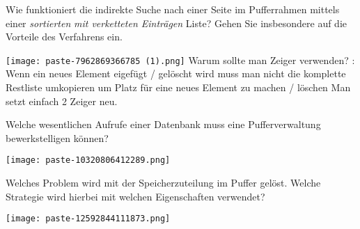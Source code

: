 \documentclass{article}
\begin{document}
\begin{tcolorbox}[colback=white!10!white,colframe=lightgray!75!black,
  savelowerto=\jobname_ex.tex,breakable,enhanced,lines before break=40]

\begin{center}
 Wie funktioniert die indirekte Suche nach einer Seite im Pufferrahmen mittels einer
\textit{sortierten
}\textit{mit verketteten Einträgen
}Liste? Gehen Sie insbesondere auf die Vorteile des Verfahrens ein. 

\end{center}

\tcblower

\justifying
\texttt{[image: paste-7962869366785 (1).png]}
Warum sollte man Zeiger verwenden?
:
Wenn ein neues Element eigefügt / gelöscht wird muss man nicht die komplette Restliste umkopieren um Platz für eine neues Element zu machen / löschen  Man setzt einfach 2 Zeiger neu.

\end{tcolorbox}
\begin{tcolorbox}[colback=white!10!white,colframe=lightgray!75!black,
  savelowerto=\jobname_ex.tex,breakable,enhanced,lines before break=40]

\begin{center}
 Welche wesentlichen Aufrufe einer Datenbank muss eine Pufferverwaltung bewerkstelligen können? 

\end{center}

\tcblower

\justifying
\texttt{[image: paste-10320806412289.png]}

\end{tcolorbox}
\begin{tcolorbox}[colback=white!10!white,colframe=lightgray!75!black,
  savelowerto=\jobname_ex.tex,breakable,enhanced,lines before break=40]

\begin{center}
 Welches Problem wird mit der Speicherzuteilung im Puffer gelöst. Welche Strategie wird hierbei mit welchen Eigenschaften verwendet? 

\end{center}

\tcblower

\justifying
\texttt{[image: paste-12592844111873.png]}

\end{tcolorbox}
\end{document}
